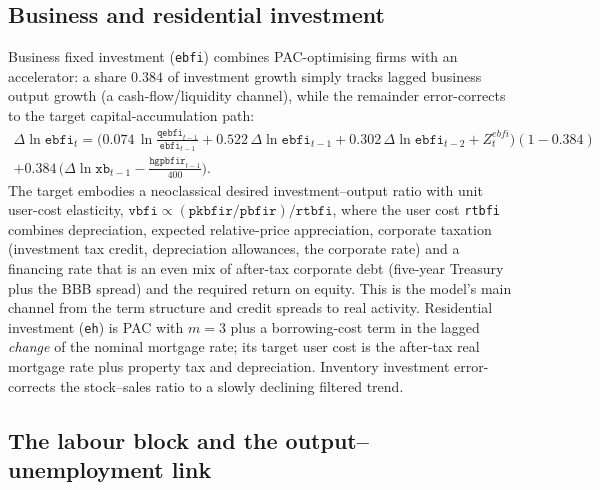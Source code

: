 \subsection{Business and residential investment}
\label{sec:investment}

Business fixed investment (\texttt{ebfi}) combines PAC-optimising firms with an accelerator: a share $0.384$ of investment growth simply tracks lagged business output growth (a cash-flow/liquidity channel), while the remainder error-corrects to the target capital-accumulation path:
\begin{multline}
\Delta\ln \texttt{ebfi}_t = \big(0.074\,\ln\tfrac{\texttt{qebfi}_{t-1}}{\texttt{ebfi}_{t-1}} + 0.522\,\Delta\ln \texttt{ebfi}_{t-1} + 0.302\,\Delta\ln \texttt{ebfi}_{t-2} + Z^{ebfi}_t\big)(1-0.384) \\
 + 0.384\,\big(\Delta\ln \texttt{xb}_{t-1}-\tfrac{\texttt{hgpbfir}_{t-1}}{400}\big).
\label{eq:ebfi}
\end{multline}
The target embodies a neoclassical desired investment--output ratio with unit user-cost elasticity, $\texttt{vbfi}\propto (\texttt{pkbfir}/\texttt{pbfir})/\texttt{rtbfi}$, where the user cost \texttt{rtbfi} combines depreciation, expected relative-price appreciation, corporate taxation (investment tax credit, depreciation allowances, the corporate rate) and a financing rate that is an even mix of after-tax corporate debt (five-year Treasury plus the BBB spread) and the required return on equity. This is the model's main channel from the term structure and credit spreads to real activity. Residential investment (\texttt{eh}) is PAC with $m=3$ plus a borrowing-cost term in the lagged \emph{change} of the nominal mortgage rate; its target user cost is the after-tax real mortgage rate plus property tax and depreciation. Inventory investment error-corrects the stock--sales ratio to a slowly declining filtered trend.

\subsection{The labour block and the output--unemployment link}
\label{sec:labour}

